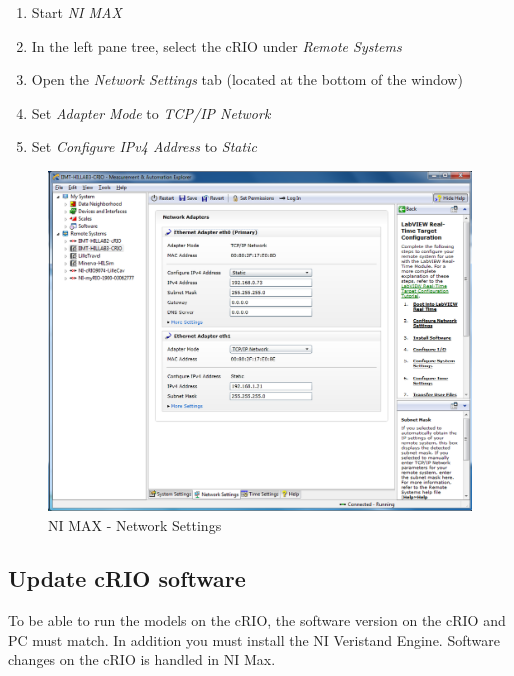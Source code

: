 \documentclass[a4paper,twoside,english]{report}
\begin{document}
\begin{enumerate}
\item Start \emph{NI MAX}
\item In the left pane tree, select the cRIO under \emph{Remote Systems}
\item Open the \emph{Network Settings} tab (located at the bottom of the
window)
\item Set \emph{Adapter Mode} to \emph{TCP/IP Network}
\item Set \emph{Configure IPv4 Address} to \emph{Static}
\end{enumerate}
\begin{figure}[!h]
\centering \includegraphics[scale=0.45]{Screenshots/Screenshot_2015-01-16_14-10-14.png}
\caption{NI MAX - Network Settings}

\label{fig: network settings} 
\end{figure}

\FloatBarrier

\newpage{}

\subsection{Update cRIO software}

To be able to run the models on the cRIO, the software version on
the cRIO and PC must match. In addition you must install the NI Veristand
Engine. Software changes on the cRIO is handled in NI Max.
\end{document}
